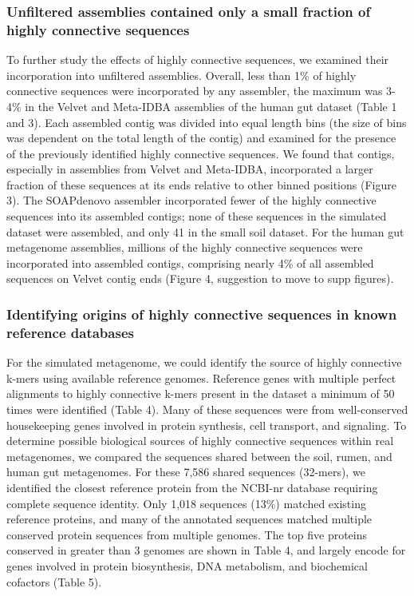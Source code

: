 \documentclass[10pt]{article}
\begin{document}
\subsubsection*{Unfiltered assemblies contained only a small fraction of highly connective sequences}
To further study the effects of highly connective sequences, we examined their incorporation into unfiltered assemblies.   Overall, less than 1\% of highly connective sequences were incorporated by any assembler, the maximum was 3-4\% in the Velvet and Meta-IDBA assemblies of the human gut dataset (Table 1 and 3).  Each assembled contig was divided into equal length bins (the size of bins was dependent on the total length of the contig) and examined for the presence of the previously identified highly connective sequences.  We found that contigs, especially in assemblies from Velvet and Meta-IDBA, incorporated a larger fraction of these sequences at its ends relative to other binned positions (Figure 3).  The SOAPdenovo assembler incorporated fewer of the highly connective sequences into its assembled contigs; none of these sequences in the simulated dataset were assembled, and only 41 in the small soil dataset.  For the human gut metagenome assemblies, millions of the highly connective sequences were incorporated into assembled contigs, comprising nearly 4\% of all assembled sequences on Velvet contig ends (Figure 4, suggestion to move to supp figures).

\subsubsection*{Identifying origins of highly connective sequences in known reference databases}

For the simulated metagenome, we could identify the source of highly connective k-mers using available reference genomes. Reference genes with multiple perfect alignments to highly connective k-mers present in the dataset a minimum of 50 times were identified (Table 4).  Many of these sequences were from well-conserved housekeeping genes involved in protein synthesis, cell transport, and signaling.  To determine possible biological sources of highly connective sequences within real metagenomes, we compared the sequences shared between the soil, rumen, and human gut metagenomes.  For these 7,586 shared sequences (32-mers), we identified the closest reference protein from the NCBI-nr database requiring complete sequence identity.  Only 1,018 sequences (13\%) matched existing reference proteins, and many of the annotated sequences matched multiple conserved protein sequences from multiple genomes.  The top five proteins conserved in greater than 3 genomes are shown in Table 4, and largely encode for genes involved in protein biosynthesis, DNA metabolism, and biochemical cofactors (Table 5).
\end{document}
